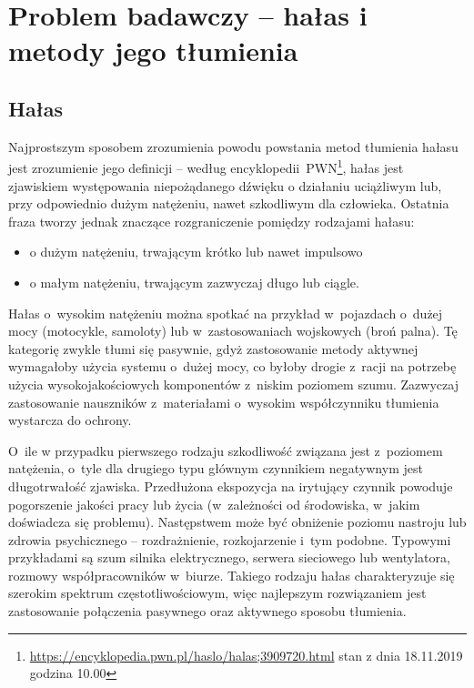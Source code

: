\chapter{Problem badawczy -- hałas i metody jego tłumienia}
\label{cha:teoria}

\section{Hałas}
\label{sec:hałas}
Najprostszym sposobem zrozumienia powodu powstania metod tłumienia hałasu jest zrozumienie jego definicji -- według encyklopedii~PWN\footnote{\url{https://encyklopedia.pwn.pl/haslo/halas;3909720.html} stan z dnia 18.11.2019 godzina 10.00}, hałas jest zjawiskiem występowania niepożądanego dźwięku o działaniu uciążliwym lub, przy odpowiednio dużym natężeniu, nawet szkodliwym dla człowieka. Ostatnia fraza tworzy jednak znaczące rozgraniczenie pomiędzy rodzajami hałasu:
\begin{itemize}
	\item o dużym natężeniu, trwającym krótko lub nawet impulsowo
	\item o małym natężeniu, trwającym zazwyczaj długo lub ciągle.
\end{itemize}
Hałas o~wysokim natężeniu można spotkać na przykład w~pojazdach o~dużej mocy (motocykle, samoloty) lub w~zastosowaniach wojskowych (broń palna). Tę kategorię zwykle tłumi się pasywnie, gdyż zastosowanie metody aktywnej wymagałoby użycia systemu o~dużej mocy, co byłoby drogie z~racji na potrzebę użycia wysokojakościowych komponentów z~niskim poziomem szumu. Zazwyczaj zastosowanie nauszników z~materiałami o~wysokim współczynniku tłumienia %
wystarcza do ochrony.

O~ile w przypadku pierwszego rodzaju szkodliwość związana jest z~poziomem natężenia, o~tyle dla drugiego typu głównym czynnikiem negatywnym jest długotrwałość zjawiska. Przedłużona ekspozycja na irytujący czynnik powoduje pogorszenie jakości pracy lub życia (w~zależności od środowiska, w~jakim doświadcza się problemu). Następstwem może być obniżenie poziomu nastroju lub zdrowia psychicznego -- rozdrażnienie, rozkojarzenie i~tym podobne. Typowymi przykładami są szum silnika elektrycznego, serwera sieciowego lub wentylatora, rozmowy współpracowników w~biurze. Takiego rodzaju hałas charakteryzuje się szerokim spektrum częstotliwościowym, więc najlepszym rozwiązaniem jest zastosowanie połączenia pasywnego oraz aktywnego sposobu tłumienia. 
